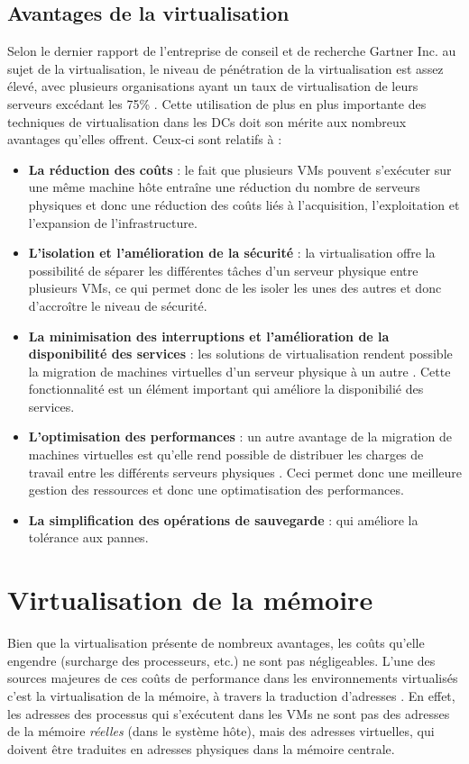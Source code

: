 \subsection{Avantages de la virtualisation}
Selon le dernier rapport de l’entreprise de conseil et de recherche Gartner Inc. au sujet de la virtualisation, le niveau de pénétration de la virtualisation est assez élevé, avec plusieurs organisations ayant un taux de virtualisation de leurs serveurs excédant les 75\% \cite{online3}. Cette utilisation de plus en plus importante des techniques de virtualisation dans les DCs doit son mérite aux nombreux avantages qu'elles offrent. Ceux-ci sont relatifs à :

\begin{itemize}[label=, font=\large \color{darkorange}]
    \item \textbf{La réduction des coûts} : le fait que plusieurs VMs pouvent s'exécuter sur une même machine hôte entraîne une réduction du nombre de serveurs physiques et donc une réduction des coûts liés à l'acquisition, l'exploitation et l'expansion de l'infrastructure. 
    \item \textbf{L'isolation et l'amélioration de la sécurité} : la virtualisation offre la possibilité de séparer les différentes tâches d'un serveur physique entre plusieurs VMs, ce qui permet donc de les isoler les unes des autres et donc d'accroître le niveau de sécurité.
    \item \textbf{La minimisation des interruptions et l'amélioration de la disponibilité des services} : les solutions de virtualisation rendent possible la migration de machines virtuelles d'un serveur physique à un autre \cite{article3, article4}. Cette fonctionnalité est un élément important qui améliore la disponibilié des services.
    \item \textbf{L'optimisation des performances} : un autre avantage de la migration de machines virtuelles est qu'elle rend possible de distribuer les charges de travail entre les différents serveurs physiques \cite{article3, article4}. Ceci permet donc une meilleure gestion des ressources et donc une optimatisation des performances.
    \item \textbf{La simplification des opérations de sauvegarde} : qui améliore la tolérance aux pannes.
\end{itemize}

\section{Virtualisation de la mémoire}
Bien que la virtualisation présente de nombreux avantages, les coûts qu'elle engendre (surcharge des processeurs, etc.) ne sont pas négligeables. L'une des sources majeures de ces coûts de performance dans les environnements virtualisés c'est la virtualisation de la mémoire, à travers la traduction d'adresses \cite{article6, article8}. En effet, les adresses des processus qui s'exécutent dans les VMs ne sont pas des adresses de la mémoire \textit{réelles} (dans le système hôte), mais des adresses virtuelles, qui doivent être traduites en adresses physiques dans la mémoire centrale. 

